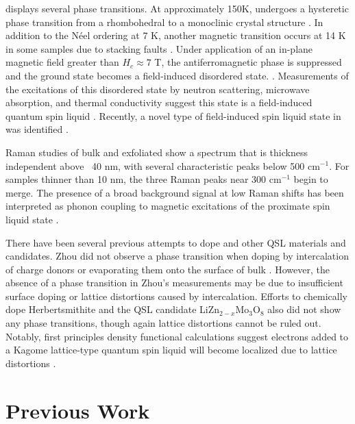 \documentclass[11pt]{article}
\begin{document}
\rucl displays several phase transitions. At approximately 150K, \rucl  undergoes a hysteretic phase transition from a rhombohedral to a monoclinic crystal structure \cite{Kubota2015,Ziatdinov2016,Glamazda2017,Reschke2017}. In addition to the N{\'e}el ordering at 7 K, another magnetic transition occurs at 14 K in some samples due to stacking faults \cite{Banerjee2016}. Under application of an in-plane magnetic field greater than $H_{c} \approx 7$ T, the antiferromagnetic phase is suppressed and the ground state becomes a field-induced disordered state. \cite{Hentrich2017,Wolter2017,Banerjee2017,Wang2017,Baek2017}. Measurements of the excitations of this disordered state by neutron scattering, microwave absorption, and thermal conductivity suggest this state is a field-induced quantum spin liquid \cite{Banerjee2016,Wellm2017,Kasahara2018}. Recently, a novel type of field-induced spin liquid state in \rucl was identified \cite{Lampen-Kelley2018}.

Raman studies of bulk and exfoliated \rucl show a spectrum that is thickness independent above ~40 nm, with several characteristic peaks below 500 cm$^{-1}$. For samples thinner than 10 nm, the three Raman peaks near 300 cm$^{-1}$ begin to merge. The presence of a broad background signal at low Raman shifts has been interpreted as phonon coupling to magnetic excitations of the proximate spin liquid state \cite{Zhou2018,Du2019}.

There have been several previous attempts to dope \rucl and other QSL materials and candidates. Zhou did not observe a phase transition when doping \rucl by intercalation of charge donors or evaporating them onto the surface of bulk \rucl \cite{Zhou2016}. However, the absence of a phase transition in Zhou's measurements may be due to insufficient surface doping or lattice distortions caused by intercalation. Efforts to chemically dope Herbertsmithite \cite{Kelly2016} and the QSL candidate LiZn$_{2-x}$Mo$_{3}$O$_{8}$ \cite{Sheckelton2015} also did not show any phase transitions, though again lattice distortions cannot be ruled out. Notably, first principles density functional calculations suggest electrons added to a Kagome lattice-type quantum spin liquid will become localized due to lattice distortions \cite{Liu2018}.

\section{Previous Work}
\end{document}
